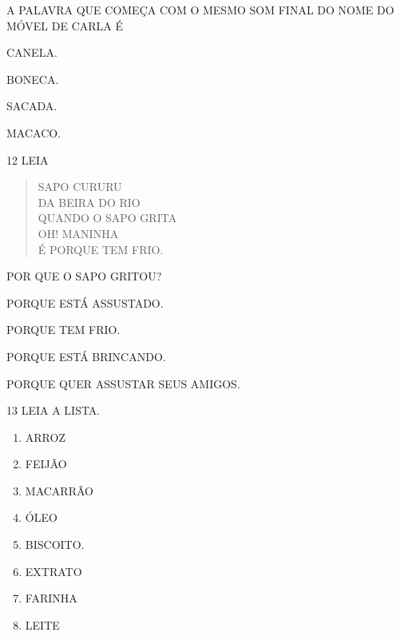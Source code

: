 
A PALAVRA QUE COMEÇA COM O MESMO SOM FINAL DO NOME DO MÓVEL DE CARLA É 

\begin{escolha}
\item CANELA.

\item BONECA.

\item SACADA.

\item MACACO.
\end{escolha}

\num{12} LEIA

\begin{verse}
SAPO CURURU\\
DA BEIRA DO RIO\\
QUANDO O SAPO GRITA\\
OH! MANINHA\\
É PORQUE TEM FRIO.
\end{verse}


POR QUE O SAPO GRITOU?

\begin{escolha}
\item PORQUE ESTÁ ASSUSTADO. 

\item PORQUE TEM FRIO.

\item PORQUE ESTÁ BRINCANDO.

\item PORQUE QUER ASSUSTAR SEUS AMIGOS.
\end{escolha}

\num{13} LEIA A LISTA.

\begin{enumerate}
\item ARROZ

\item FEIJÃO

\item MACARRÃO

\item ÓLEO

\item BISCOITO.

\item EXTRATO

\item FARINHA

\item LEITE
\end{enumerate}


